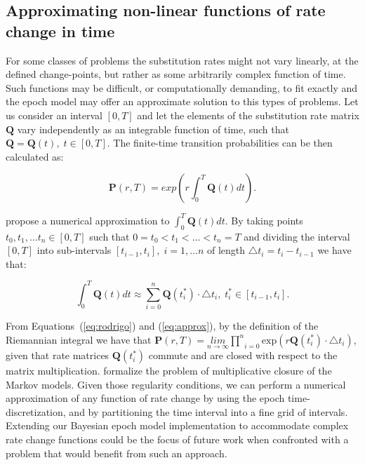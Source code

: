 \subsection{Approximating non-linear functions of rate change in time\label{sub:nonlinear}}

For some classes of problems the substitution rates might not vary linearly, at the defined change-points, but rather as some arbitrarily complex function of time. 
Such functions may be difficult, or computationally demanding, to fit exactly and the epoch model may offer an approximate solution to this types of problems.
Let us consider an interval $\left[0,T\right]$ and let the elements of the substitution rate matrix $\mathbf{Q}$ vary independently as an integrable function of time, such that $\mathbf{Q}=\mathbf{Q}(t),\; t\in\left[0,T\right]$. 
The finite-time transition probabilities can be then calculated as: 

\begin{equation}
\ensuremath{\mathbf{P}}(r,T)=exp\left(r\int_{0}^{T}\mathbf{Q}(t)dt\right).\label{eq:rodrigo}
\end{equation}

\noindent
\citet{Rodrigo2008} propose a numerical approximation to $\int_{0}^{T}\mathbf{Q}(t)dt$. 
By taking points $t_{0},t_{1},\ldots t_{n}\in[0,T]$ such that $0=t_{0}<t_{1}<\ldots<t_{n}=T$ and dividing the interval $\left[0,T\right]$ into sub-intervals $\left[t_{i-1},t_{i}\right],\; i=1,\ldots n$ of length $\triangle t_{i}=t_{i}-t_{i-1}$ we have that:   

\begin{equation}
\int_{0}^{T}\mathbf{Q}(t)dt\approx\underset{i=0}{\overset{n}{\sum}}\mathbf{Q}(t_{i}^{*})\cdot\triangle t_{i},\; t_{i}^{*}\in[t_{i-1},t_{i}].\label{eq:approx}
\end{equation}

\noindent
From Equations~(\ref{eq:rodrigo}) and (\ref{eq:approx}), by the definition of the Riemannian integral we have that $\mathbf{P}(r,T)=\underset{n\rightarrow\infty}{lim}\underset{i=0}{\overset{n}{\prod}}\text{exp}\left(r\mathbf{Q}(t_{i}^{*})\cdot\triangle t_{i}\right)$, given that rate matrices $\mathbf{Q}(t_{i}^{*})$ commute 
and are closed with respect to the matrix multiplication.
\citet{Sumner2012} formalize the problem of multiplicative closure of the Markov models. 
Given those regularity conditions, we can perform a numerical approximation of any function of rate change by using the epoch time-discretization, and by partitioning the time interval into a fine grid of intervals.
Extending our Bayesian epoch model implementation to accommodate complex rate change functions could be the focus of future work when confronted with a problem that would benefit from such an approach.

